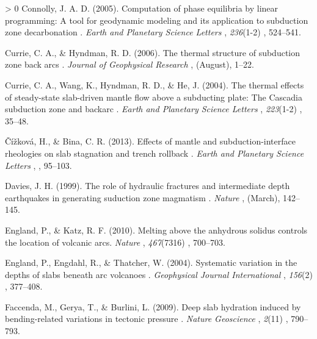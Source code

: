 \documentclass[draft,linenumbers]{agujournal2018} %
\newlength{\cslhangindent} %
\newenvironment{CSLReferences}[3] %
 {%
  \setlength{\parindent}{0pt} %
  \ifodd #1 \everypar{\setlength{\hangindent}{\cslhangindent}}\ignorespaces\fi %
  \ifnum #2 > 0 %
  \setlength{\parskip}{#2\baselineskip} %
  \fi %
 }%
 {} %
\providecommand{\DIFaddtex}[1]{{\protect\color{blue} \sf #1}} %
\providecommand{\DIFadd}[1]{\texorpdfstring{\DIFaddtex{#1}}{#1}} %
\begin{document}
\begin{CSLReferences}{1}{0}
\leavevmode\hypertarget{ref-Connolly2005}{}%
\DIFadd{Connolly, J. A. D. (2005). }{\DIFadd{Computation of phase equilibria by linear
programming: A tool for geodynamic modeling and its application to
subduction zone decarbonation}}\DIFadd{. }\emph{\DIFadd{Earth and Planetary Science
Letters}}\DIFadd{, }\emph{236}(1-2)\DIFadd{, 524--541.
}

\leavevmode\hypertarget{ref-Currie2006}{}%
\DIFadd{Currie, C. A., \& Hyndman, R. D. (2006). }{\DIFadd{The thermal structure of
subduction zone back arcs}}\DIFadd{. }\emph{\DIFadd{Journal of Geophysical Research}}\DIFadd{,
}\emph{\DIFadd{111}}\DIFadd{(August), 1--22.
}

\leavevmode\hypertarget{ref-Currie2004}{}%
\DIFadd{Currie, C. A., Wang, K., Hyndman, R. D., \& He, J. (2004). }{\DIFadd{The thermal
effects of steady-state slab-driven mantle flow above a subducting
plate: The Cascadia subduction zone and backarc}}\DIFadd{. }\emph{\DIFadd{Earth and
Planetary Science Letters}}\DIFadd{, }\emph{223}(1-2)\DIFadd{, 35--48.
}

\leavevmode\hypertarget{ref-Cizkova2013}{}%
\DIFadd{Čížková, H., \& Bina, C. R. (2013). }{\DIFadd{Effects of mantle and
subduction-interface rheologies on slab stagnation and trench rollback}}\DIFadd{.
}\emph{\DIFadd{Earth and Planetary Science Letters}}\DIFadd{, }\emph{\DIFadd{379}}\DIFadd{, 95--103.
}

\leavevmode\hypertarget{ref-Davies1999}{}%
\DIFadd{Davies, J. H. (1999). }{\DIFadd{The role of hydraulic fractures and intermediate
depth earthquakes in generating suduction zone magmatism}}\DIFadd{.
}\emph{\DIFadd{Nature}}\DIFadd{, }\emph{\DIFadd{417}}\DIFadd{(March), 142--145.
}

\leavevmode\hypertarget{ref-England2010}{}%
\DIFadd{England, P., \& Katz, R. F. (2010). Melting above the anhydrous solidus
controls the location of volcanic arcs. }\emph{\DIFadd{Nature}}\DIFadd{, }\emph{467}(7316)\DIFadd{,
700--703.
}

\leavevmode\hypertarget{ref-England2004}{}%
\DIFadd{England, P., Engdahl, R., \& Thatcher, W. (2004). }{\DIFadd{Systematic variation
in the depths of slabs beneath arc volcanoes}}\DIFadd{. }\emph{\DIFadd{Geophysical Journal
International}}\DIFadd{, }\emph{156}(2)\DIFadd{, 377--408.
}

\leavevmode\hypertarget{ref-Faccenda2009}{}%
\DIFadd{Faccenda, M., Gerya, T., \& Burlini, L. (2009). }{\DIFadd{Deep slab hydration
induced by bending-related variations in tectonic pressure}}\DIFadd{.
}\emph{\DIFadd{Nature Geoscience}}\DIFadd{, }\emph{2}(11)\DIFadd{, 790--793.
}


\end{CSLReferences}
\end{document}
